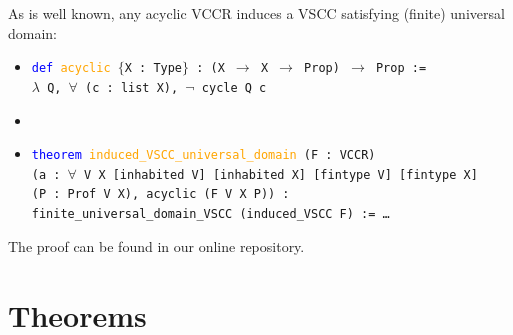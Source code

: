 \documentclass[runningheads]{llncs}
\begin{document}
As is well known, any acyclic VCCR induces a VSCC satisfying (finite) universal domain:
\begin{itemize}
\item[] \texttt{\textcolor{blue}{def} \textcolor{orange}{acyclic} $\{$X : Type$\}$ : (X $\to$ X $\to$ Prop) $\to$ Prop :=}\\
\texttt{$\lambda$ Q, $\forall$ (c : list X), $\neg$ cycle Q c}
\item[]
\item[] \texttt{\textcolor{blue}{theorem} \textcolor{orange}{induced\_VSCC\_universal\_domain} (F : VCCR)}\\
\texttt{(a : $\forall$ V X [inhabited V] [inhabited X] [fintype V] [fintype X]} \\
\texttt{(P : Prof V X), acyclic (F V X P)) :}\\
\texttt{finite\_universal\_domain\_VSCC (induced\_VSCC F) := \dots}
\end{itemize}
The proof can be found in our online repository.

\section{Theorems}\label{Theorems}
\end{document}
